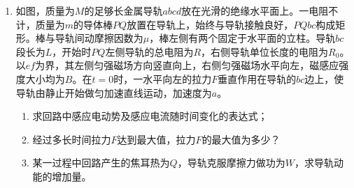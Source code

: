 \begin{enumerate}



\newpage
\item 
{}
如图，质量为$ M $的足够长金属导轨$ abcd $放在光滑的绝缘水平面上。一电阻不计，质量为$ m $的导体棒$ PQ $放置在导轨上，始终与导轨接触良好，$ PQbc $构成矩形。棒与导轨间动摩擦因数为$ \mu $，棒左侧有两个固定于水平面的立柱。导轨$ bc $段长为$ L $，开始时$ PQ $左侧导轨的总电阻为$ R $，右侧导轨单位长度的电阻为$ R_{0} $。以$ ef $为界，其左侧匀强磁场方向竖直向上，右侧匀强磁场水平向左，磁感应强度大小均为$ B $。在$ t=0 $时，一水平向左的拉力$ F $垂直作用在导轨的$ bc $边上，使导轨由静止开始做匀加速直线运动，加速度为$ a $。
\begin{enumerate}
\renewcommand{\labelenumi}{\arabic{enumi}.}
\item
求回路中感应电动势及感应电流随时间变化的表达式；
\item 
经过多长时间拉力$ F $达到最大值，拉力$ F $的最大值为多少？
\item 
某一过程中回路产生的焦耳热为$ Q $，导轨克服摩擦力做功为$ W $，求导轨动能的增加量。



\end{enumerate}
\begin{figure}[h!]
\flushright

\end{figure}


\end{enumerate}
